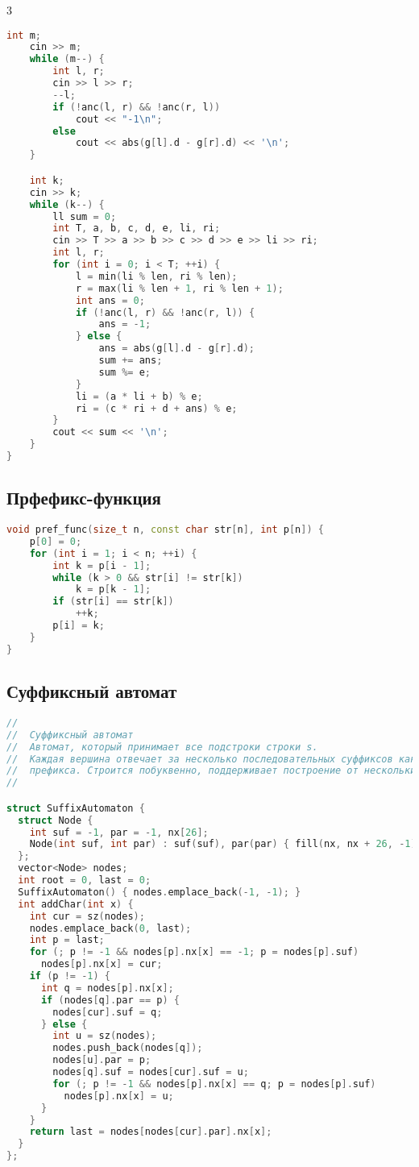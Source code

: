 \documentclass[10pt,a4paper,landscape,twosided]{extarticle}
\begin{document}
\begin{multicols}{3}
\begin{lstlisting}[language=C++]
    int m;
    cin >> m;
    while (m--) {
        int l, r;
        cin >> l >> r;
        --l;
        if (!anc(l, r) && !anc(r, l))
            cout << "-1\n";
        else
            cout << abs(g[l].d - g[r].d) << '\n';
    }

    int k;
    cin >> k;
    while (k--) {
        ll sum = 0;
        int T, a, b, c, d, e, li, ri;
        cin >> T >> a >> b >> c >> d >> e >> li >> ri;
        int l, r;
        for (int i = 0; i < T; ++i) {
            l = min(li % len, ri % len);
            r = max(li % len + 1, ri % len + 1);
            int ans = 0;
            if (!anc(l, r) && !anc(r, l)) {
                ans = -1;
            } else {
                ans = abs(g[l].d - g[r].d);
                sum += ans;
                sum %= e;
            }
            li = (a * li + b) % e;
            ri = (c * ri + d + ans) % e;
        }
        cout << sum << '\n';
    }
}
\end{lstlisting}

\subsection{Прфефикс-функция}
\begin{lstlisting}[language=C++]
void pref_func(size_t n, const char str[n], int p[n]) {
    p[0] = 0;
    for (int i = 1; i < n; ++i) {
        int k = p[i - 1];
        while (k > 0 && str[i] != str[k])
            k = p[k - 1];
        if (str[i] == str[k])
            ++k;
        p[i] = k;
    }
}
\end{lstlisting}

\subsection{Суффиксный автомат}
\begin{lstlisting}[language=C++]
//
//  Суффиксный автомат
//  Автомат, который принимает все подстроки строки s.
//  Каждая вершина отвечает за несколько последовательных суффиксов какого-то
//  префикса. Строится побуквенно, поддерживает построение от нескольких строк.
//

struct SuffixAutomaton {
  struct Node {
    int suf = -1, par = -1, nx[26];
    Node(int suf, int par) : suf(suf), par(par) { fill(nx, nx + 26, -1); }
  };
  vector<Node> nodes;
  int root = 0, last = 0;
  SuffixAutomaton() { nodes.emplace_back(-1, -1); }
  int addChar(int x) {
    int cur = sz(nodes);
    nodes.emplace_back(0, last);
    int p = last;
    for (; p != -1 && nodes[p].nx[x] == -1; p = nodes[p].suf)
      nodes[p].nx[x] = cur;
    if (p != -1) {
      int q = nodes[p].nx[x];
      if (nodes[q].par == p) {
        nodes[cur].suf = q;
      } else {
        int u = sz(nodes);
        nodes.push_back(nodes[q]);
        nodes[u].par = p;
        nodes[q].suf = nodes[cur].suf = u;
        for (; p != -1 && nodes[p].nx[x] == q; p = nodes[p].suf)
          nodes[p].nx[x] = u;
      }
    }
    return last = nodes[nodes[cur].par].nx[x];
  }
};
\end{lstlisting}


\end{multicols}
\end{document}
